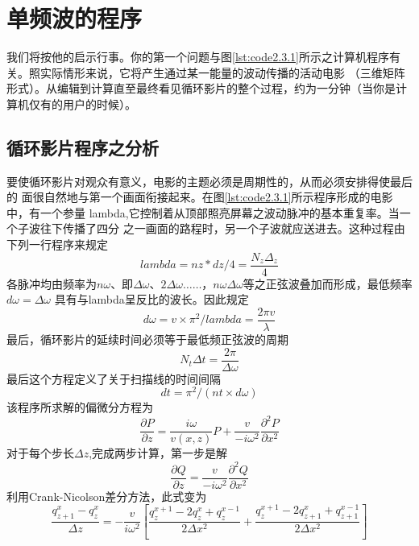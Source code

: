 \section{单频波的程序}
我们将按他的启示行事。你的第一个问题与图\ref{lst:code2.3.1}所示之计算机程序有关。照实际情形来说，它将产生通过某一能量的波动传播的活动电影
（三维矩阵形式）。从编辑到计算直至最终看见循环影片的整个过程，约为一分钟（当你是计算机仅有的用户的时候）。
\subsection{循环影片程序之分析}
要使循环影片对观众有意义，电影的主题必须是周期性的，从而必须安排得使最后的
面很自然地与第一个画面衔接起来。在图\ref{lst:code2.3.1}所示程序形成的电影中，有一个参量
lambda,它控制着从顶部照亮屏幕之波动脉冲的基本重复率。当一个子波往下传播了四分
之一画面的路程时，另一个子波就应送进去。这种过程由下列一行程序来规定
\begin{equation*}
lambda=nz*dz/4=\frac{N_z\Delta_z}{4}
\end{equation*}
各脉冲均由频率为$n\omega$、即$\Delta \omega$、$2\Delta\omega\ldots\ldots$，$n\omega\Delta\omega$等之正弦波叠加而形成，最低频率$d\omega=\Delta\omega$
具有与lambda呈反比的波长。因此规定
\begin{equation*}
d\omega=v\times\pi^2/lambda=\frac{2\pi v}{\lambda}
\end{equation*}
最后，循环影片的延续时间必须等于最低频正弦波的周期
\begin{equation*}
N_t\Delta t=\frac{2\pi}{\Delta \omega}
\end{equation*}
最后这个方程定义了关于扫描线的时间间隔
\begin{equation*}
dt=\pi^2/(nt\times d\omega)
\end{equation*}
该程序所求解的偏微分方程为
\begin{equation}
\frac{\partial P}{\partial z}=\frac{i\omega}{v(x,z)}P+\frac{v}{-i\omega^2}\frac{\partial^2 P}{\partial x^2}
\label{eq:ex2.3.1}
\end{equation}
对于每个步长$\Delta z$,完成两步计算，第一步是解
\begin{equation}
\frac{\partial Q}{\partial z}=\frac{v}{-i\omega^2}\frac{\partial^2 Q}{\partial x^2}
\label{eq:ex2.3.2}
\end{equation}
利用Crank-Nicolson差分方法，此式变为
\begin{equation*}
\frac{q_{z+1}^x-q_z^x}{\Delta z}=-\frac{v}{i\omega^2}[\frac{q_z^{x+1}-2q_z^x+q_z^{x-1}}{2\Delta x^2}+
\frac{q_z^{x+1}-2q_{z+1}^x+q_{z+1}^{x-1}}{2\Delta x^2}]
\end{equation*}
